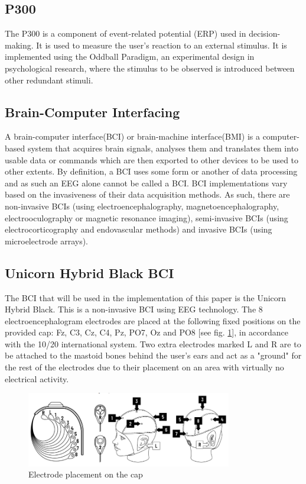 \subsection{P300}
The P300 is a component of event-related potential (ERP) used in decision-making. It is used to measure the user's reaction to an external stimulus. It is implemented using the Oddball Paradigm, an experimental design in psychological research, where the stimulus to be observed is introduced between other redundant stimuli.

\subsection{Brain-Computer Interfacing}
A brain-computer interface(BCI) or brain-machine interface(BMI) is a computer-based system that acquires brain signals, analyses them and translates them into usable data or commands which are then exported to other devices to be used to other extents. By definition, a BCI uses some form or another of data processing and as such an EEG alone cannot be called a BCI\cite{Shih_2012}. BCI implementations vary based on the invasiveness of their data acquisition methods. As such, there are non-invasive BCIs (using electroencephalography, magnetoencephalography, electrooculography or magnetic resonance imaging), semi-invasive BCIs (using electrocorticography and endovascular methods) and invasive BCIs (using microelectrode arrays).

\subsection{Unicorn Hybrid Black BCI}
The BCI that will be used in the implementation of this paper is the Unicorn Hybrid Black. This is a non-invasive BCI using EEG technology. The 8 electroencephalogram electrodes are placed at the following fixed positions on the provided cap: Fz, C3, Cz, C4, Pz, PO7, Oz and PO8 [see fig. \ref{fig:electrode placement}], in accordance with the 10/20 international system. Two extra electrodes marked L and R are to be attached to the mastoid bones behind the user's ears and act as a "ground" for the rest of the electrodes due to their placement on an area with virtually no electrical activity. 

\begin{figure}
  \centering
  \includegraphics[width=0.8\textwidth]{Graphics/Electrode Placement.png}
  \caption{Electrode placement on the cap}
  \label{fig:electrode placement}
\end{figure}


